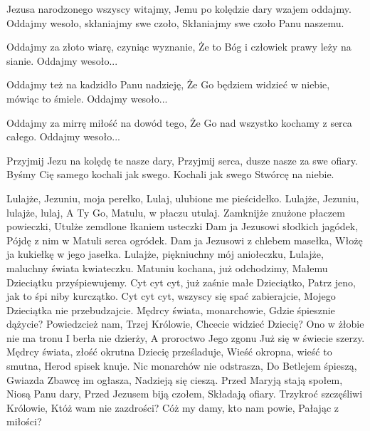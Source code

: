 \beginverse
Jezusa narodzonego wszyscy witajmy,
Jemu po kolędzie dary wzajem oddajmy.
\endverse
\beginchorus
Oddajmy wesoło, skłaniajmy swe czoło,
Skłaniajmy swe czoło Panu naszemu.
\endchorus

\beginverse
Oddajmy za złoto wiarę, czyniąc wyznanie,
Że to Bóg i człowiek prawy leży na sianie.
\endverse
\beginchorus
Oddajmy wesoło...
\endchorus

\beginverse
Oddajmy też na kadzidło Panu nadzieję,
Że Go będziem widzieć w niebie, mówiąc to śmiele.
\endverse
\beginchorus
Oddajmy wesoło...
\endchorus

\beginverse
Oddajmy za mirrę miłość na dowód tego,
Że Go nad wszystko kochamy z serca całego.
\endverse
\beginchorus
Oddajmy wesoło...
\endchorus

\beginverse
Przyjmij Jezu na kolędę te nasze dary,
Przyjmij serca, dusze nasze za swe ofiary.
Byśmy Cię samego kochali jak swego.
Kochali jak swego Stwórcę na niebie.
\endverse
\endsong


\beginverse
    Lulajże, Jezuniu, moja perełko,
    Lulaj, ulubione me pieścidełko.
\endverse
\beginchorus
        Lulajże, Jezuniu, lulajże, lulaj,
        A Ty Go, Matulu, w płaczu utulaj.
\endchorus
\beginverse
    Zamknijże znużone płaczem powieczki,
    Utulże zemdlone łkaniem usteczki
\endverse
\beginverse
    Dam ja Jezusowi słodkich jagódek,
    Pójdę z nim w Matuli serca ogródek.
\endverse
\beginverse
    Dam ja Jezusowi z chlebem masełka,
    Włożę ja kukiełkę w jego jasełka.
\endverse
\beginverse
    Lulajże, piękniuchny mój aniołeczku,
    Lulajże, maluchny świata kwiateczku.
\endverse
\beginverse
    Matuniu kochana, już odchodzimy,
    Małemu Dzieciątku przyśpiewujemy.
\endverse
\beginverse
    Cyt cyt cyt, już zaśnie małe Dzieciątko,
    Patrz jeno, jak to śpi niby kurczątko.
\endverse
\beginverse
    Cyt cyt cyt, wszyscy się spać zabierajcie,
    Mojego Dzieciątka nie przebudzajcie.
\endverse
\endsong
\beginverse
    Mędrcy świata, monarchowie,
    Gdzie śpiesznie dążycie?
    Powiedzcież nam, Trzej Królowie,
    Chcecie widzieć Dziecię?
\endverse
\beginchorus
    Ono w żłobie nie ma tronu
    I berła nie dzierży,
    A proroctwo Jego zgonu
    Już się w świecie szerzy.
\endchorus
\beginverse
    Mędrcy świata, złość okrutna
    Dziecię prześladuje,
    Wieść okropna, wieść to smutna,
    Herod spisek knuje.
\endverse
\beginchorus
    Nic monarchów nie odstrasza,
    Do Betlejem śpieszą,
    Gwiazda Zbawcę im ogłasza,
    Nadzieją się cieszą.
\endchorus
\beginverse
    Przed Maryją stają społem,
    Niosą Panu dary,
    Przed Jezusem biją czołem,
    Składają ofiary.
\endverse
\beginchorus
    Trzykroć szczęśliwi Królowie,
    Któż wam nie zazdrości?
    Cóż my damy, kto nam powie,
    Pałając z miłości?
\endchorus
\endsong


